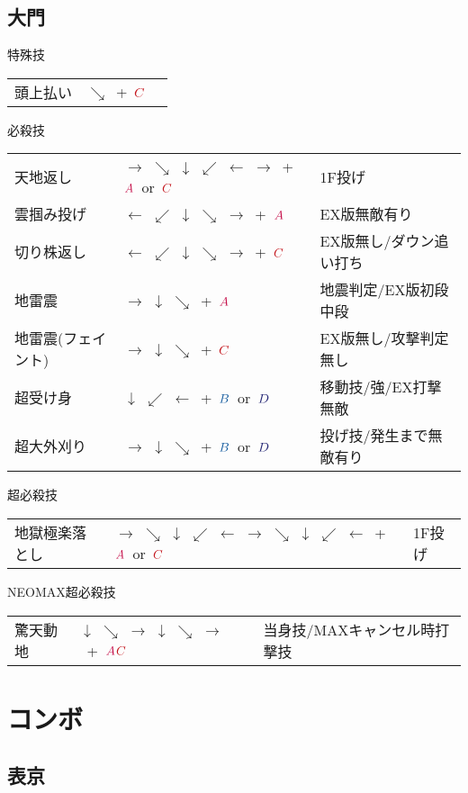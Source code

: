 \documentclass[a4j,11pt]{jarticle}
\def\A{$\textcolor{Acolor}{A}$}
\def\C{$\textcolor{Ccolor}{C}$}
\def\B{$\textcolor{Bcolor}{B}$}
\def\D{$\textcolor{Dcolor}{D}$}
\begin{document}
\subsection{大門}
\begin{itembox}[l]{特殊技}
\begin{tabular}{lll}
頭上払い&$\searrow$\ +\ \C&
\end{tabular}
\end{itembox}
\begin{itembox}[l]{必殺技}
\begin{tabular}{lll}
天地返し&$\rightarrow$ $\searrow$ $\downarrow$ $\swarrow$ $\leftarrow$ $\rightarrow$\ +\ \A\ or\ \C&1F投げ\\
雲掴み投げ&$\leftarrow$ $\swarrow$ $\downarrow$ $\searrow$ $\rightarrow$\ +\ \A&EX版無敵有り\\
切り株返し&$\leftarrow$ $\swarrow$ $\downarrow$ $\searrow$ $\rightarrow$\ +\ \C&EX版無し/ダウン追い打ち\\
地雷震&$\rightarrow$ $\downarrow$ $\searrow$\ +\ \A&地震判定/EX版初段中段\\
地雷震(フェイント)&$\rightarrow$ $\downarrow$ $\searrow$\ +\ \C&EX版無し/攻撃判定無し\\
超受け身&$\downarrow$ $\swarrow$ $\leftarrow$\ +\ \B\ or\ \D&移動技/強/EX打撃無敵\\
超大外刈り&$\rightarrow$ $\downarrow$ $\searrow$\ +\ \B\ or\ \D&投げ技/発生まで無敵有り
\end{tabular}
\end{itembox}
\begin{itembox}[l]{超必殺技}
\begin{tabular}{lll}
地獄極楽落とし&$\rightarrow$ $\searrow$ $\downarrow$ $\swarrow$ $\leftarrow$ $\rightarrow$ $\searrow$ $\downarrow$ $\swarrow$ $\leftarrow$\ +\ \A\ or\ \C&1F投げ
\end{tabular}
\end{itembox}
\begin{itembox}[l]{NEOMAX超必殺技}
\begin{tabular}{lll}
驚天動地&$\downarrow$ $\searrow$ $\rightarrow$ $\downarrow$ $\searrow$ $\rightarrow$\ +\ \A\C&当身技/MAXキャンセル時打撃技
\end{tabular}
\end{itembox}
\newpage
\section{コンボ}
\subsection{表京}
\end{document}
